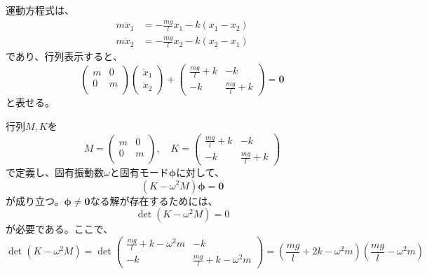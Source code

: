 \documentclass[a4paper]{jsarticle}
\begin{document}
\subsection{}
運動方程式は、
\begin{equation}
  \begin{aligned}
    m \ddot{x}_1 &= -\frac{mg}{l} x_1 - k(x_1 - x_2) \\
    m \ddot{x}_2 &= -\frac{mg}{l} x_2 - k(x_2 - x_1)
  \end{aligned}
\end{equation}
であり、行列表示すると、
\begin{equation}
  \begin{pmatrix}
    m & 0 \\
    0 & m \\
  \end{pmatrix}
  \begin{pmatrix}
    \ddot{x}_1 \\ \ddot{x}_2
  \end{pmatrix} +
  \begin{pmatrix}
    \frac{mg}{l} + k & -k \\
    -k & \frac{mg}{l} + k
  \end{pmatrix} = \boldsymbol{0}
\end{equation}
と表せる。\par
行列$M,K$を
\begin{equation}
  M =
  \begin{pmatrix}
    m & 0 \\
    0 & m \\
  \end{pmatrix},\quad
  K =
  \begin{pmatrix}
    \frac{mg}{l} + k & -k \\
    -k & \frac{mg}{l} + k
  \end{pmatrix}
\end{equation}
で定義し、固有振動数$\omega$と固有モード$\boldsymbol{\phi}$に対して、
\begin{equation}
  (K - \omega^2 M) \boldsymbol{\phi} = \boldsymbol{0}
\end{equation}
が成り立つ。$\boldsymbol{\phi} \neq \boldsymbol{0}$なる解が存在するためには、
\begin{equation}
  \det (K - \omega^2 M) = 0
\end{equation}
が必要である。ここで、
\begin{equation}
  \det (K - \omega^2 M) = \det
  \begin{pmatrix}
    \frac{mg}{l} + k - \omega^2 m & -k \\
    -k & \frac{mg}{l} + k - \omega^2 m
  \end{pmatrix} =
  \left(\frac{mg}{l} + 2k - \omega^2 m\right)
  \left(\frac{mg}{l} - \omega^2 m\right)
\end{equation}
\end{document}
